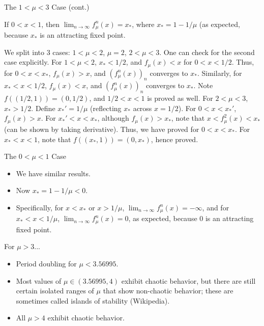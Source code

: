 \documentclass[aspectratio=169]{beamer}
\begin{document}
\begin{frame}{The $1<\mu<3$ Case (cont.)}
\begin{prop}
    If $0<x<1$, then $\displaystyle \lim_{n\rightarrow\infty} f_\mu^n(x) = x_*$, where $x_* = 1-1/\mu$ (as expected, because $x_*$ is an attracting fixed point. 
\end{prop}
\begin{pf}
    We split into 3 cases: $1<\mu<2$, $\mu =2$, $2 <\mu<3$. One can check for the second case explicitly. 
    For $1<\mu<2$, $x_* < 1/2$, and $f_\mu(x)<x$ for $0<x<1/2$. Thus, for $0<x<x_*$, $f_\mu(x) > x$, and $(f_\mu^n(x))_n$ converges to $x_*$. Similarly, for $x_* < x < 1/2$, $f_\mu(x) < x$, and $(f_\mu^n(x))_n$ converges to $x_*$. Note $f((1/2,1)) = (0,1/2)$, and $1/2<x<1$ is proved as well. 
    For $2<\mu<3$, $x_* > 1/2$. Define $x_*' = 1/\mu$ (reflecting $x_*$ across $x=1/2$). For $0<x<x_*'$, $f_\mu(x) > x$. For $x_*'<x<x_*$, although $f_\mu(x)>x_*$, note that $x< f_\mu^2(x) < x_*$ (can be shown by taking derivative). Thus, we have proved for $0<x<x_*$. For $x_*<x<1$, note that $f((x_*,1))=(0,x_*)$, hence proved. 
\end{pf}
\end{frame}

\begin{frame}{The $0<\mu<1$ Case}
\begin{itemize}
    \item We have similar results. 
    \item Now $x_*=1-1/\mu<0$. 
    \item Specifically, for $x<x_*$ or $x>1/\mu$, $\displaystyle\lim_{n\rightarrow \infty} f_\mu^n(x) = -\infty$, and for $x_* < x < 1/\mu$, $\displaystyle\lim_{n\rightarrow \infty} f_\mu^n(x) = 0$, as expected, because 0 is an attracting fixed point. 
\end{itemize}
\end{frame}

\begin{frame}{For $\mu>3$...}
\begin{itemize}
    \item Period doubling for $\mu < 3.56995$.  
    \item Most values of $\mu \in (3.56995,4)$ exhibit chaotic behavior, but there are still certain isolated ranges of $\mu$ that show non-chaotic behavior; these are sometimes called islands of stability (Wikipedia).
    \item All $\mu > 4$ exhibit chaotic behavior. 
\end{itemize}
\end{frame}
\end{document}
